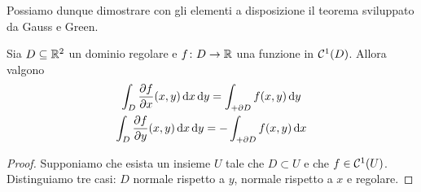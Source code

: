 Possiamo dunque dimostrare con gli elementi a disposizione il teorema sviluppato da Gauss e Green.
\begin{teorema} \label{t:gauss-green}
	Sia $D\subseteq\mathbb{R}^2$ un dominio regolare e $f\colon D\to\mathbb{R}$ una funzione in $\mathcal{C}^{{1}}(D)$.
	Allora valgono
	\begin{gather}
		\int_D\frac{\partial {f}}{\partial {x}}(x,y)\,\textup{d} x\,\textup{d} y=\int_{+\partial D}f(x,y)\,\textup{d} y
		\label{eq:gauss-green-y}\\
		\int_D\frac{\partial {f}}{\partial {y}}(x,y)\,\textup{d} x\,\textup{d} y=-\int_{+\partial D}f(x,y)\,\textup{d} x
		\label{eq:gauss-green-x}
	\end{gather}
\end{teorema}
\begin{proof}
	Supponiamo che esista un insieme $U$ tale che $D\subset U$ e che $f\in\mathcal{C}^{{1}}(U)$.
	Distinguiamo tre casi: $D$ normale rispetto a $y$, normale rispetto a $x$ e regolare.


\end{proof}
